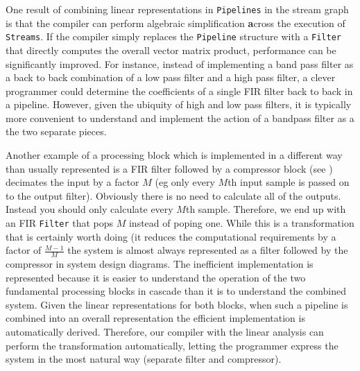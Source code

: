 One result of combining linear representations in {\tt Pipelines} in the stream graph is that  
the compiler can perform algebraic simplification {\textbf across} the execution of {\tt Streams}. 
If the compiler simply replaces the {\tt Pipeline} structure with a {\tt Filter} that 
directly computes the overall vector matrix product, performance can be significantly improved.
For instance, instead of implementing a band pass filter as a back to back combination
of a low pass filter and a high pass filter, a clever programmer could determine the coefficients 
of a single FIR filter back to back in a pipeline. However, given the ubiquity of high and 
low pass filters, it is typically more convenient to understand and implement the action
of a bandpass filter as a the two separate pieces.

Another example of a processing block which is implemented in a different way than
usually represented is a FIR filter followed by a compressor block 
(see \cite{oppenheim-discrete}) decimates the input by a factor $M$ (eg only every $M$th 
input sample is passed on to the output filter). 
Obviously there is no need to calculate all of the outputs. 
Instead you should only calculate every $M$th sample.
Therefore, we end up with an FIR {\tt Filter} that pops $M$ instead of poping one. While
this is a transformation that is certainly worth doing (it reduces the computational
requirements by a factor of $\frac{M-1}{M}$ the system is almost always represented
as a filter followed by the compressor in system design diagrams. The inefficient
implementation is represented because it is easier to understand the operation of the
two fundamental processing blocks in cascade than it is to understand the combined system.
Given the linear representations for both blocks, when such a pipeline is combined into an
overall representation the efficient implementation is automatically derived. Therefore,
our compiler with the linear analysis can perform the transformation automatically, 
letting the programmer express the system in the most natural way (separate filter and compressor).

